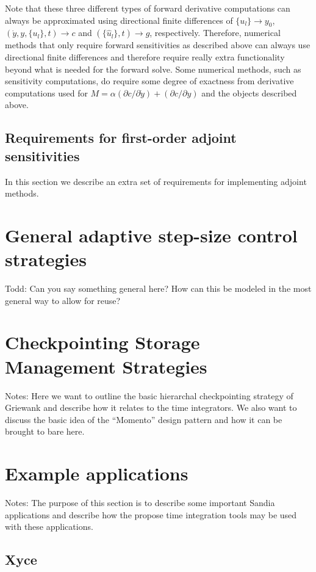 \documentclass[pdf,ps2pdf,11pt]{SANDreport}
\begin{document}
Note that these three different types of forward derivative computations can
always be approximated using directional finite differences of $\{u_l\}
{}\rightarrow y_0$, $(\dot{y},y,\{u_l\},t) {}\rightarrow c$ and
$(\{\hat{u}_l\},t) {}\rightarrow g$, respectively.  Therefore, numerical
methods that only require forward sensitivities as described above can always
use directional finite differences and therefore require really extra
functionality beyond what is needed for the forward solve.  Some numerical
methods, such as sensitivity computations, do require some degree of
exactness from derivative computations used for $M = {}\alpha ({}\partial c /
{}\partial {}\dot{y}) + ({}\partial c / {}\partial y)$ and the objects
described above.

\subsection{Requirements for first-order adjoint sensitivities}

In this section we describe an extra set of requirements for implementing
adjoint methods.

\section{General adaptive step-size control strategies}

Todd: Can you say something general here?  How can this be modeled in the most
general way to allow for reuse?

\section{Checkpointing Storage Management Strategies}

Notes: Here we want to outline the basic hierarchal checkpointing strategy of
Griewank and describe how it relates to the time integrators.  We also want to
discuss the basic idea of the ``Momento'' design pattern and how it can be
brought to bare here.

\section{Example applications}

Notes: The purpose of this section is to describe some important Sandia
applications and describe how the propose time integration tools may be used
with these applications.

\subsection{Xyce}
\end{document}
